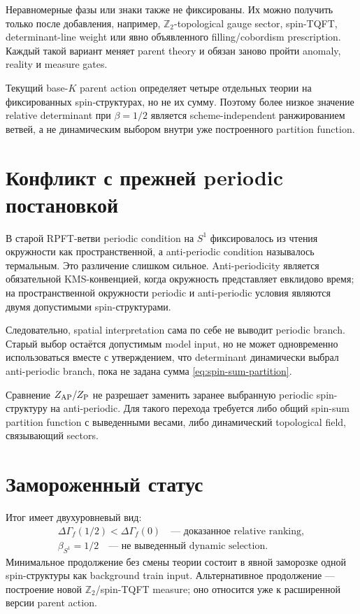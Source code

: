 Неравномерные фазы или знаки также не фиксированы. Их можно получить только
после добавления, например, \(\mathbb Z_2\)-topological gauge sector,
spin-TQFT, determinant-line weight или явно объявленного filling/cobordism
prescription. Каждый такой вариант меняет parent theory и обязан заново
пройти anomaly, reality и measure gates.

\begin{theorem}
Текущий base-\(K\) parent action определяет четыре отдельных теории на
фиксированных spin-структурах, но не их сумму. Поэтому более низкое значение
relative determinant при \(\beta=1/2\) является scheme-independent
ранжированием ветвей, а не динамическим выбором внутри уже построенного
partition function.
\end{theorem}

\section{Конфликт с прежней periodic постановкой}

В старой RPFT-ветви periodic condition на \(S^1\) фиксировалось из чтения
окружности как пространственной, а anti-periodic condition называлось
термальным. Это различение слишком сильное. Anti-periodicity является
обязательной KMS-конвенцией, когда окружность представляет евклидово время;
на пространственной окружности periodic и anti-periodic условия являются
двумя допустимыми spin-структурами.

Следовательно, spatial interpretation сама по себе не выводит periodic
branch. Старый выбор остаётся допустимым model input, но не может
одновременно использоваться вместе с утверждением, что determinant
динамически выбрал anti-periodic branch, пока не задана сумма
\eqref{eq:spin-sum-partition}.

\begin{nogocriterion}
Сравнение \(Z_{\rm AP}/Z_{\rm P}\) не разрешает заменить заранее выбранную
periodic spin-структуру на anti-periodic. Для такого перехода требуется
либо общий spin-sum partition function с выведенными весами, либо
динамический topological field, связывающий sectors.
\end{nogocriterion}

\section{Замороженный статус}

Итог имеет двухуровневый вид:
\begin{equation}
 \boxed{
 \begin{gathered}
 \Delta\Gamma_f(1/2)<\Delta\Gamma_f(0)
 \quad\text{--- доказанное relative ranking},
 \\
 \beta_{S^1}=1/2
 \quad\text{--- не выведенный dynamic selection}.
 \end{gathered}}
\end{equation}
Минимальное продолжение без смены теории состоит в явной заморозке одной
spin-структуры как background train input. Альтернативное продолжение ---
построение новой \(\mathbb Z_2\)/spin-TQFT measure; оно относится уже к
расширенной версии parent action.

